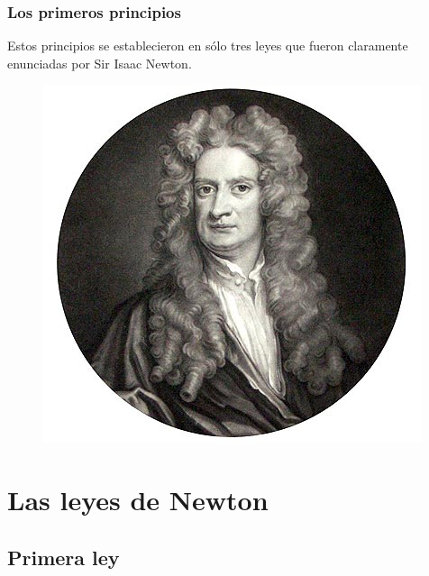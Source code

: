 \documentclass[14pt]{beamer}
\begin{document}
\begin{frame}
\frametitle{Los primeros principios}
Estos principios se establecieron en sólo tres leyes que fueron claramente enunciadas por Sir Isaac Newton.
\begin{figure}
    \centering
    \includegraphics[scale=0.35]{Imagenes/Newton.jpg}
\end{figure}
\end{frame}

\section{Las leyes de Newton}
\subsection{Primera ley}
\end{document}
